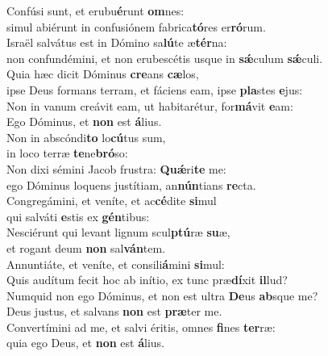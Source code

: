 \evenverse Confúsi sunt, et erubu\textbf{é}runt \textbf{om}nes:~\*\\
\evenverse simul abiérunt in confusiónem fabrica\textbf{tó}res er\textbf{ró}rum.\\
\oddverse Israël salvátus est in Dómino sa\textbf{lú}te æ\textbf{tér}na:~\*\\
\oddverse non confundémini, et non erubescétis usque in \textbf{sǽ}culum \textbf{sǽ}culi.\\
\evenverse Quia hæc dicit Dóminus \textbf{cre}ans \textbf{cæ}los,~\*\\
\evenverse ipse Deus formans terram, et fáciens eam, ipse \textbf{pla}stes \textbf{e}jus:\\
\oddverse Non in vanum creávit eam, ut habitarétur, for\textbf{má}vit \textbf{e}am:~\*\\
\oddverse Ego Dóminus, et \textbf{non} est \textbf{á}lius.\\
\evenverse Non in abscóndi\textbf{to} lo\textbf{cú}tus sum,~\*\\
\evenverse in loco terræ \textbf{te}ne\textbf{bró}so:\\
\oddverse Non dixi sémini Jacob frustra: \textbf{Quǽ}ri\textbf{te} me:~\*\\
\oddverse ego Dóminus loquens justítiam, an\textbf{nún}tians \textbf{re}cta.\\
\evenverse Congregámini, et veníte, et ac\textbf{cé}dite \textbf{si}mul~\*\\
\evenverse qui salváti \textbf{e}stis ex \textbf{gén}tibus:\\
\oddverse Nesciérunt qui levant lignum scul\textbf{ptú}ræ \textbf{su}æ,~\*\\
\oddverse et rogant deum \textbf{non} sal\textbf{ván}tem.\\
\evenverse Annuntiáte, et veníte, et consili\textbf{á}mini \textbf{si}mul:~\*\\
\evenverse Quis audítum fecit hoc ab inítio, ex tunc præ\textbf{dí}xit \textbf{il}lud?\\
\oddverse Numquid non ego Dóminus, et non est ultra \textbf{De}us \textbf{ab}sque me?~\*\\
\oddverse Deus justus, et salvans \textbf{non} est \textbf{præ}ter me.\\
\evenverse Convertímini ad me, et salvi éritis, omnes \textbf{fi}nes \textbf{ter}ræ:~\*\\
\evenverse quia ego Deus, et \textbf{non} est \textbf{á}lius.\\
